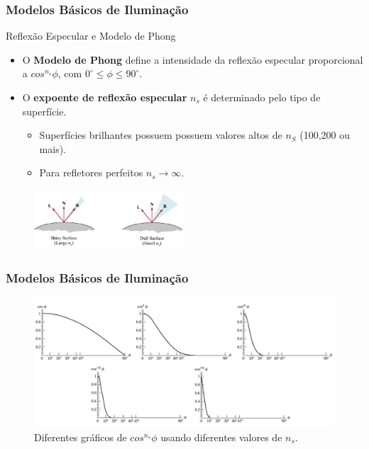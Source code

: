 \documentclass{beamer}
\begin{document}
\begin{frame}
\frametitle{Modelos Básicos de Iluminação}

	\begin{block}{Reflexão Especular e Modelo de Phong}
		\begin{itemize}
			\item O \textbf{Modelo de Phong} define a intensidade da reflexão especular proporcional a $cos^{n_s} \phi$, com $0^\circ \leq \phi \leq 90^\circ$.
			\item O \textbf{expoente de reflexão especular} $n_s$ é determinado pelo tipo de superfície.
			\begin{itemize}
				\item Superfícies brilhantes possuem possuem valores altos de $n_S$ (100,200 ou mais).
				\item Para refletores perfeitos $n_s \to \infty$.
			\end{itemize}
		\end{itemize}
	\end{block}
	
	\begin{figure}[!h]
		\begin{center}
		\includegraphics[width=0.5\textwidth]{Figures/RefEspSup}
		\end{center}
	\end{figure}	
\end{frame}



\begin{frame}
\frametitle{Modelos Básicos de Iluminação}
	\begin{figure}[!h]
		\begin{center}
		\includegraphics[width=1.0\textwidth]{Figures/VarExp}
		\caption{Diferentes gráficos de $cos^{n_s} \phi$ usando diferentes valores de $n_s$.}
		\end{center}
	\end{figure}	
\end{frame}
\end{document}
